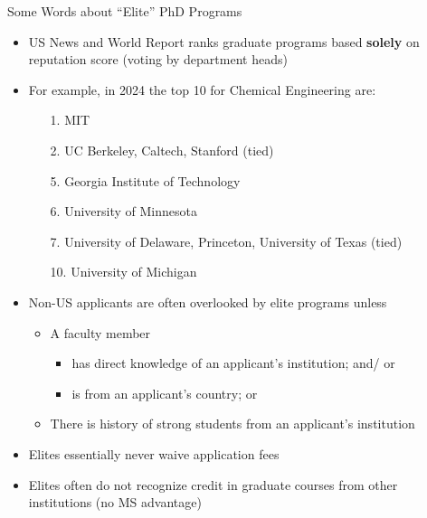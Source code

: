 \begin{frame}[fragile]{Some Words about ``Elite'' PhD Programs}
\begin{itemize}
    \item US News and World Report ranks graduate programs based {\bf solely} on reputation score (voting by department heads)
    \item For example, in 2024 the top 10 for Chemical Engineering are:
    \begin{enumerate}
        \item[1.] MIT
        \item[2.] \textcolor{blue!70!black}{UC Berkeley}, Caltech, Stanford (tied)
        \item[5.] Georgia Institute of Technology
        \item[6.] University of Minnesota
        \item[7.] University of Delaware, Princeton, University of Texas (tied)
        \item[10.] University of Michigan
    \end{enumerate}
    \item Non-US applicants are often overlooked by elite programs \textcolor{green!60!black}{unless}
    \begin{itemize}
        \item A faculty member 
        \begin{itemize}
            \item has direct knowledge of an applicant's institution; and/ or
            \item is from an applicant's country; or
        \end{itemize}
        \item There is history of strong students from an applicant's institution
    \end{itemize}
    \item Elites essentially never waive application fees
    \item Elites often do not recognize credit in graduate courses from other institutions (no MS advantage)
\end{itemize}
\end{frame}

